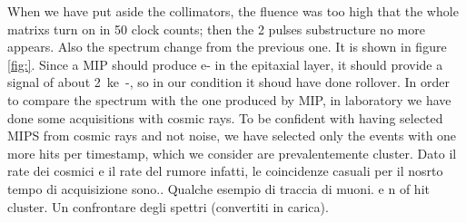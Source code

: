    When we have put aside the collimators, the fluence was too high that the whole matrixs turn on in 50 clock counts; then the 2 pulses substructure no more appears. Also the spectrum change from the previous one. 
   It is shown in figure \ref{fig:}.
   Since a MIP should produce e- in the epitaxial layer, it should provide a signal of about \SI{2}{ke-}, so in our condition it shoud have done rollover. 
   In order to compare the spectrum with the one produced by MIP, in laboratory we have done some acquisitions with cosmic rays. 
   To be confident with having selected MIPS from cosmic rays and not noise, we have selected only the events with one more hits per timestamp, which we consider are prevalentemente cluster. Dato il rate dei cosmici e il rate del rumore infatti, le coincidenze casuali per il nosrto tempo di acquisizione sono.. Qualche esempio di traccia di muoni. e n of hit cluster. 
   Un confrontare degli spettri (convertiti in carica). 


